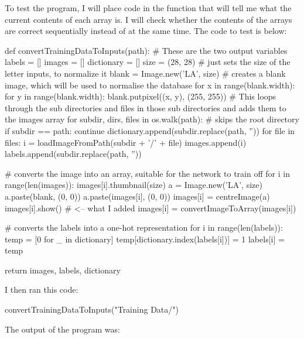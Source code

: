 \documentclass{report}
\begin{document}
\newline
To test the program, I will place code in the function that will tell me what the current contents of each array is. I will check whether the contents of the arrays are correct sequentially instead of at the same time. The code to test  is below:
\begin{python}
def convertTrainingDataToInputs(path):
    # These are the two output variables
    labels = []
    images = []
    dictionary = []
    size = (28, 28)  # just sets the size of the letter inputs, to normalize it
    blank = Image.new('LA', size)  # creates a blank image, which will be used to normalise the database
    for x in range(blank.width):
        for y in range(blank.width):
            blank.putpixel((x, y), (255, 255))
    # This loops through the sub directories and files in those sub directories and adds them to the images array
    for subdir, dirs, files in os.walk(path):
        # skips the root directory
        if subdir == path:
            continue
        dictionary.append(subdir.replace(path, ''))
        for file in files:
            i = loadImageFromPath(subdir + '/' + file)
            images.append(i)
            labels.append(subdir.replace(path, ''))

    # converts the image into an array, suitable for the network to train off
    for i in range(len(images)):
        images[i].thumbnail(size)
        a = Image.new('LA', size)
        a.paste(blank, (0, 0))
        a.paste(images[i], (0, 0))
        images[i] = centreImage(a)
        images[i].show()  # <-- what I added
        images[i] = convertImageToArray(images[i])

    # converts the labels into a one-hot representation
    for i in range(len(labels)):
        temp = [0 for _ in dictionary]
        temp[dictionary.index(labels[i])] = 1
        labels[i] = temp

    return images, labels, dictionary
\end{python}
I then ran this code:
\begin{python}
convertTrainingDataToInputs("Training Data/")
\end{python}
The output of the program was:
\end{document}
